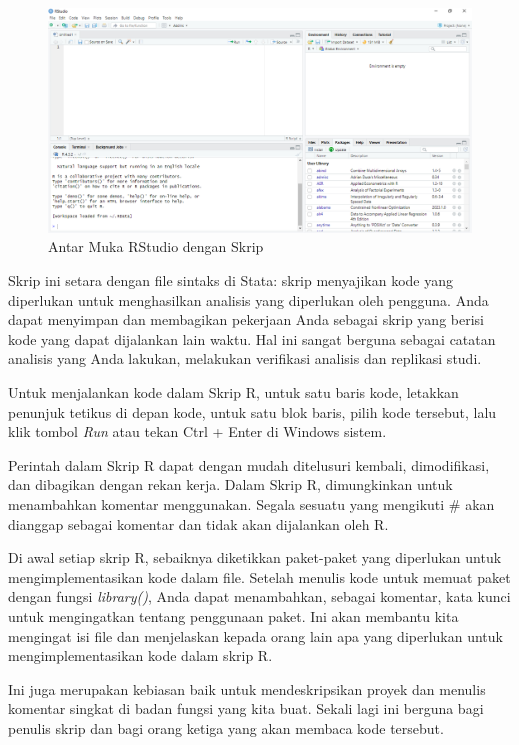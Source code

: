 \documentclass[a4paper, nobind]{templates/ociamthesis}
\begin{document}
\begin{figure}[H]
\includegraphics[width=1\linewidth]{figures/4qu} \caption{Antar Muka RStudio dengan Skrip}\label{fig:4qu}
\end{figure}

Skrip ini setara dengan file sintaks di Stata: skrip menyajikan kode yang diperlukan untuk menghasilkan analisis yang diperlukan oleh pengguna. Anda dapat menyimpan dan membagikan pekerjaan Anda sebagai skrip yang berisi kode yang dapat dijalankan lain waktu. Hal ini sangat berguna sebagai catatan analisis yang Anda lakukan, melakukan verifikasi analisis dan replikasi studi.

Untuk menjalankan kode dalam Skrip R, untuk satu baris kode, letakkan penunjuk tetikus di depan kode, untuk satu blok baris, pilih kode tersebut, lalu klik tombol \emph{Run} atau tekan Ctrl + Enter di Windows sistem.

Perintah dalam Skrip R dapat dengan mudah ditelusuri kembali, dimodifikasi, dan dibagikan dengan rekan kerja. Dalam Skrip R, dimungkinkan untuk menambahkan komentar menggunakan. Segala sesuatu yang mengikuti \# akan dianggap sebagai komentar dan tidak akan dijalankan oleh R.

Di awal setiap skrip R, sebaiknya diketikkan paket-paket yang diperlukan untuk mengimplementasikan kode dalam file. Setelah menulis kode untuk memuat paket dengan fungsi \emph{library()}, Anda dapat menambahkan, sebagai komentar, kata kunci untuk mengingatkan tentang penggunaan paket. Ini akan membantu kita mengingat isi file dan menjelaskan kepada orang lain apa yang diperlukan untuk mengimplementasikan kode dalam skrip R.

Ini juga merupakan kebiasan baik untuk mendeskripsikan proyek dan menulis komentar singkat di badan fungsi yang kita buat. Sekali lagi ini berguna bagi penulis skrip dan bagi orang ketiga yang akan membaca kode tersebut.
\end{document}

